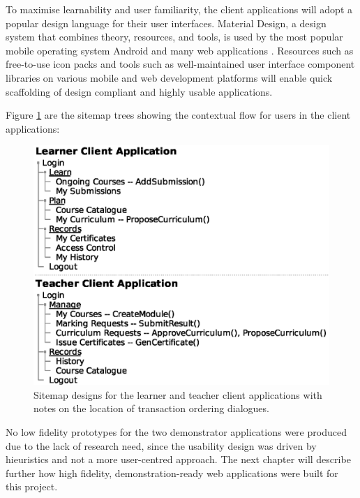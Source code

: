 To maximise learnability and user familiarity, the client applications will adopt a popular design language for their user interfaces.
Material Design, a design system that combines theory, resources, and tools, is used by the most popular mobile operating system Android
and many web applications \citep{google2018material}. Resources such as free-to-use icon packs and tools such as well-maintained
user interface component libraries on various mobile and web development platforms will enable quick scaffolding of design compliant and
highly usable applications.

Figure \ref{fig:sitemaps} are the sitemap trees showing the contextual flow for users in the client applications:

\begin{figure}[!ht]
	\centering
	\includegraphics[width=.6\textwidth]{sitemaps}
	\caption[Client Application Sitemaps]
	{Sitemap designs for the learner and teacher client applications with notes on the location of transaction ordering dialogues.} \label{fig:sitemaps}
\end{figure}

No low fidelity prototypes for the two demonstrator applications were produced due to the lack of research need,
since the usability design was driven by hieuristics and not a more user-centred approach. The next chapter will
describe further how high fidelity, demonstration-ready web applications were built for this project.